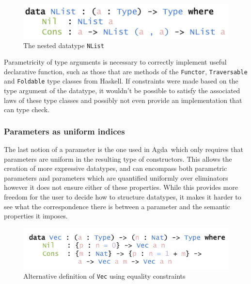 \documentclass{ituthesis}
\newcommand{\tttype}[1]{\textcolor{type-color}{\texttt{#1}}}
\theoremstyle{break}
\begin{document}
\begin{figure}[ht]
\begin{center}
    \includegraphics[scale=0.5]{Figures/NestedList.png}
\end{center}
\caption{The nested datatype \tttype{NList}}
\label{fig:nestedlist}
\end{figure}

Parametricity of type arguments is necessary to correctly implement useful declarative function, such as those that are methods of the \tttype{Functor}, \tttype{Traversable} and \tttype{Foldable} type classes from Haskell.
If constraints were made based on the type argument of the datatype, it wouldn't be possible to satisfy the associated laws of these type classes and possibly not even provide an implementation that can type check.

\subsubsection{Parameters as uniform indices}
\label{ssub:Parameters as uniform indices}
The last notion of a parameter is the one used in Agda\,\autocite{norell2009dependently} which only requires that parameters are uniform in the resulting type of constructors.
This allows the creation of more expressive datatypes, and can encompass both parametric parameters and parameters which are quantified uniformly over eliminators however it does not ensure either of these properties.
While this provides more freedom for the user to decide how to structure datatypes, it makes it harder to see what the correspondence there is between a parameter and the semantic properties it imposes.

\begin{figure}[ht]
\begin{center}
    \includegraphics[scale=0.5]{Figures/VectorAlternativeDeclaration.png}
\end{center}
\caption{Alternative definition of \tttype{Vec} using equality constraints}
\label{fig:altvecdecl}
\end{figure}
\end{document}
